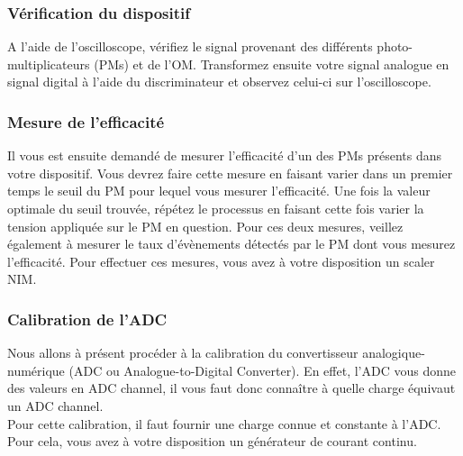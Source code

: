 \subsubsection{Vérification du dispositif}
A l'aide de l'oscilloscope, vérifiez le signal provenant des différents photo-multiplicateurs (PMs) et de l'OM. Transformez ensuite votre signal analogue en signal digital à l'aide du discriminateur et observez celui-ci sur l'oscilloscope.

\subsubsection{Mesure de l'efficacité}

Il vous est ensuite demandé de mesurer l'efficacité d'un des PMs présents dans votre dispositif. Vous devrez faire cette mesure en faisant varier dans un premier temps le seuil du PM pour lequel vous mesurer l'efficacité. Une fois la valeur optimale du seuil trouvée, répétez le processus en faisant cette fois varier la tension appliquée sur le PM en question. Pour ces deux mesures, veillez également à mesurer le taux d'évènements détectés par le PM dont vous mesurez l'efficacité. Pour effectuer ces mesures, vous avez à votre disposition un scaler NIM.


\subsubsection{Calibration de l'ADC}

Nous allons à présent procéder à la calibration du convertisseur analogique-numérique (ADC ou Analogue-to-Digital Converter). En effet, l'ADC vous donne des valeurs en ADC channel, il vous faut donc connaître à quelle charge équivaut un ADC channel.\\

Pour cette calibration, il faut fournir une charge connue et constante à l'ADC. Pour cela, vous avez à votre disposition un générateur de courant continu.

